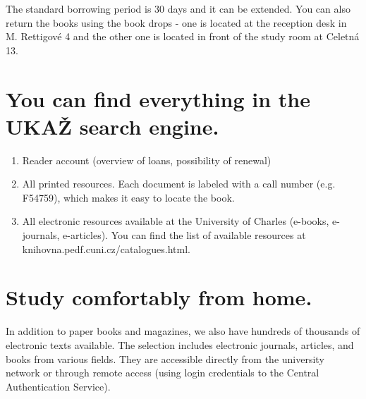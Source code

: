 The standard borrowing period is 30 days and it can be extended. You can also
return the books using the book drops - one is located at the reception desk in
M. Rettigové 4 and the other one is located in front of the study room at
Celetná 13.



\ikonka{\faSearch}
\section{You can find everything in the UKAŽ search engine.}

\begin{enumerate}


  \item Reader account (overview of loans, possibility of renewal)
  \item All printed resources. Each document is labeled with a call number
    (e.g. F54759), which makes it easy to locate the book.
  \item All electronic resources available at the University of Charles
    (e-books, e-journals, e-articles). You can find the list of available
    resources at knihovna.pedf.cuni.cz/catalogues.html.
\end{enumerate}

\ikonka{\faBed}
\section{Study comfortably from home.}
In addition to paper books and magazines, we also have hundreds of thousands of
electronic texts available. The selection includes electronic journals,
articles, and books from various fields. They are accessible directly from the
university network or through remote access (using login credentials to the
Central Authentication Service).

